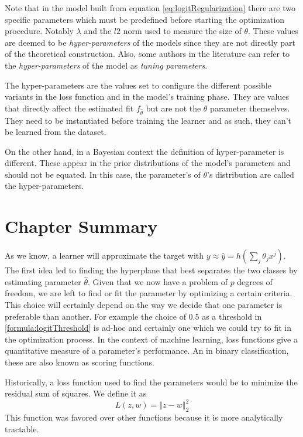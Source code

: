 Note that in the model built from equation \cref{eq:logitRegularization} there are two specific parameters which must be predefined before starting the optimization procedure.
Notably $\lambda$ and the $l2$ norm used to measure the size of $\theta$.
These values are deemed to be \textit{hyper-parameters} of the models since they are not directly part of the theoretical construction.
Also, some authors in the literature can refer to the \textit{hyper-parameters} of the model as \textit{tuning parameters}.

The hyper-parameters are the values set to configure the different possible variants in the loss function and in the model's training phase.
They are values that directly affect the estimated fit $f_{\hat{\theta}}$ but are not the $\theta$ parameter themselves.
They need to be instantiated before training the learner and as such, they can't be learned from the dataset.

On the other hand, in a Bayesian context the definition of hyper-parameter is different.
These appear in the prior distributions of the model's parameters and should not be equated.
In this case, the parameter's of $\theta$'s distribution are called the hyper-parameters.



\section{Chapter Summary}\label{section-ch_machine_learning_summary}


As we know, a learner will approximate the target with $y \approx \hat{y} = h\left(\sum_{j}\theta_j x^j\right)$.
The first idea led to finding the hyperplane that best separates the two classes by estimating parameter $\hat{\theta}$.
Given that we now have a problem of $p$ degrees of freedom, we are left to find or fit the parameter by optimizing a certain criteria.
This choice will certainly depend on the way we decide that one parameter is preferable than another.
For example the choice of $0.5$ as a threshold in \cref{formula:logitThreshold} is ad-hoc and certainly one which we could try to fit in the optimization process.
In the context of machine learning, loss functions give a quantitative measure of a parameter's performance.
An in binary classification, these are also known as scoring functions.

Historically, a loss function used to find the parameters would be to minimize the residual sum of squares.
We define it as $$L(z,w) = \left\Vert z-w \right\Vert^2_2$$
This function was favored over other functions because it is more analytically tractable.

